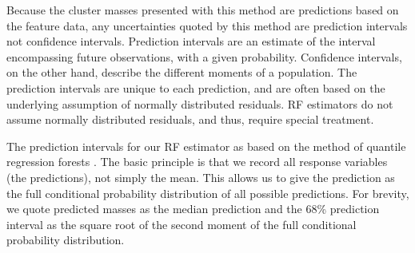 Because the cluster masses presented with this method are predictions based on the feature data, any uncertainties quoted by this method are prediction intervals not confidence intervals. Prediction intervals are an estimate of the interval encompassing future observations, with a given probability. Confidence intervals, on the other hand, describe the different moments of a population. The prediction intervals are unique to each prediction, and are often based on the underlying assumption of normally distributed residuals. RF estimators do not assume normally distributed residuals, and thus, require special treatment.  

The prediction intervals for our RF estimator as based on the method of quantile regression forests \citep{Meinshausen2006}. The basic principle is that we record all response variables (the predictions), not simply the mean. This allows us to give the prediction as the full conditional probability distribution of all possible predictions. For brevity, we quote predicted masses as the median prediction and the 68\% prediction interval as the square root of the second moment of the full conditional probability distribution.

